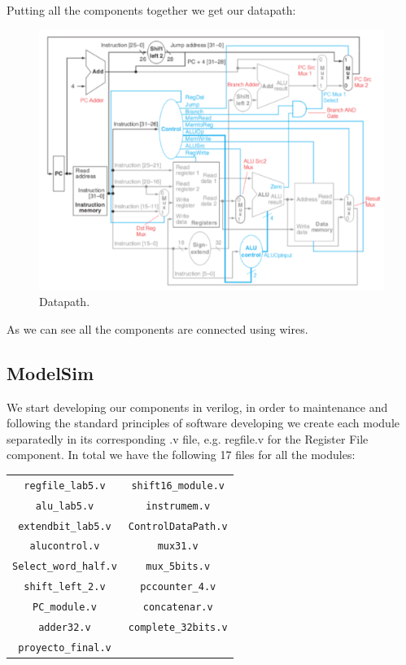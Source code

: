 \documentclass[conference]{IEEEtran}
\begin{document}
Putting all the components together we get our datapath:
\begin{figure}[h]
\includegraphics[scale=2]{datapath.png}
\caption{Datapath.}
\end{figure}

As we can see all the components are connected using wires.
\subsection{ModelSim}
We start developing our components in verilog, in order to maintenance and following the
standard principles of software developing  we create each module separatedly in its corresponding
.v file, e.g. regfile.v for the Register File component.
In total we have the following 17 files for all the modules:

\begin{table}[htbp]
\begin{center}
\begin{tabular}{c c}
\verb$regfile_lab5.v$&\verb$shift16_module.v$\\
\verb$alu_lab5.v$&\verb$instrumem.v$\\
\verb$extendbit_lab5.v$&\verb$ControlDataPath.v$\\
\verb$alucontrol.v$&\verb$mux31.v$\\
\verb$Select_word_half.v$&\verb$mux_5bits.v$\\
\verb$shift_left_2.v$&\verb$pccounter_4.v$\\
\verb$PC_module.v$&\verb$concatenar.v$\\
\verb$adder32.v$&\verb$complete_32bits.v$\\
\verb$proyecto_final.v$&\\
\end{tabular}
\end{center}
\end{table}
\end{document}
